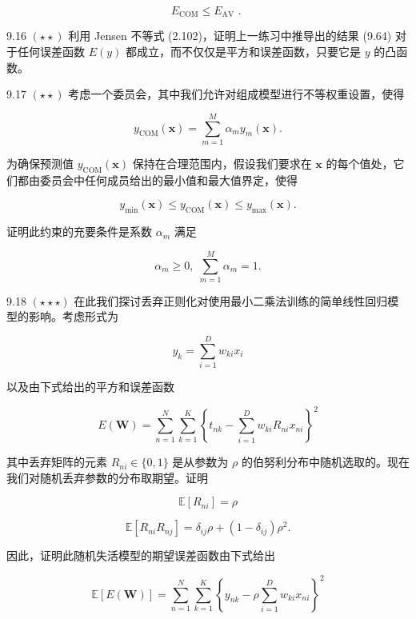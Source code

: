 \documentclass[10pt]{article}
\begin{document}
\[
{E}_{\mathrm{{COM}}} \leq  {E}_{\mathrm{{AV}}}\text{ . } \tag{9.64}
\]

9.16 \(\left( {\star  \star  }\right)\) 利用 Jensen 不等式 (2.102)，证明上一练习中推导出的结果 (9.64) 对于任何误差函数 \(E\left( y\right)\) 都成立，而不仅仅是平方和误差函数，只要它是 \(y\) 的凸函数。

9.17 \(\left( {\star  \star  }\right)\) 考虑一个委员会，其中我们允许对组成模型进行不等权重设置，使得

\[
{y}_{\mathrm{{COM}}}\left( \mathbf{x}\right)  = \mathop{\sum }\limits_{{m = 1}}^{M}{\alpha }_{m}{y}_{m}\left( \mathbf{x}\right) . \tag{9.65}
\]

为确保预测值 \({y}_{\mathrm{{COM}}}\left( \mathbf{x}\right)\) 保持在合理范围内，假设我们要求在 \(\mathbf{x}\) 的每个值处，它们都由委员会中任何成员给出的最小值和最大值界定，使得

\[
{y}_{\min }\left( \mathbf{x}\right)  \leq  {y}_{\mathrm{{COM}}}\left( \mathbf{x}\right)  \leq  {y}_{\max }\left( \mathbf{x}\right) . \tag{9.66}
\]

证明此约束的充要条件是系数 \({\alpha }_{m}\) 满足

\[
{\alpha }_{m} \geq  0,\;\mathop{\sum }\limits_{{m = 1}}^{M}{\alpha }_{m} = 1. \tag{9.67}
\]

9.18 \(\left( {\star  \star   \star  }\right)\) 在此我们探讨丢弃正则化对使用最小二乘法训练的简单线性回归模型的影响。考虑形式为

\[
{y}_{k} = \mathop{\sum }\limits_{{i = 1}}^{D}{w}_{ki}{x}_{i} \tag{9.68}
\]

以及由下式给出的平方和误差函数

\[
E\left( \mathbf{W}\right)  = \mathop{\sum }\limits_{{n = 1}}^{N}\mathop{\sum }\limits_{{k = 1}}^{K}{\left\{  {t}_{nk} - \mathop{\sum }\limits_{{i = 1}}^{D}{w}_{ki}{R}_{ni}{x}_{ni}\right\}  }^{2} \tag{9.69}
\]

其中丢弃矩阵的元素 \({R}_{ni} \in  \{ 0,1\}\) 是从参数为 \(\rho\) 的伯努利分布中随机选取的。现在我们对随机丢弃参数的分布取期望。证明

\[
\mathbb{E}\left\lbrack  {R}_{ni}\right\rbrack   = \rho  \tag{9.70}
\]

\[
\mathbb{E}\left\lbrack  {{R}_{ni}{R}_{nj}}\right\rbrack   = {\delta }_{ij}\rho  + \left( {1 - {\delta }_{ij}}\right) {\rho }^{2}. \tag{9.71}
\]

因此，证明此随机失活模型的期望误差函数由下式给出

\[
\mathbb{E}\left\lbrack  {E\left( \mathbf{W}\right) }\right\rbrack   = \mathop{\sum }\limits_{{n = 1}}^{N}\mathop{\sum }\limits_{{k = 1}}^{K}{\left\{  {y}_{nk} - \rho \mathop{\sum }\limits_{{i = 1}}^{D}{w}_{ki}{x}_{ni}\right\}  }^{2} \tag{9.72}
\]
\end{document}
